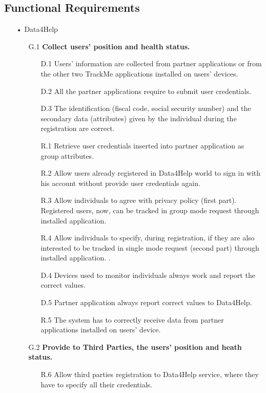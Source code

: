 \subsection{Functional Requirements}
\begin{enumerate}
\item[•]{\Large Data4Help}
	\begin{enumerate}
	\item [G.1] \textbf{Collect users' position and health status.}
		\begin{enumerate}
		\item [D.1] Users' information are collected from partner applications or from the other two TrackMe applications installed on users' devices.
		\item [D.2] All the partner applications require to submit user credentials.
		\item [D.3] The identification (fiscal code, social security number) and the secondary data (attributes) given by the individual during the registration are correct.
		\item [R.1] Retrieve user credentials inserted into partner application as group attributes.
		\item [R.2] Allow users already registered in Data4Help world to sign in with his account without provide user credentials again.
		\item [R.3] Allow individuals to agree with privacy policy (first part). Registered users, now, can be tracked in group mode request through installed application.  
		\item [R.4] Allow individuals to specify, during registration, if they are also interested to be tracked in single mode request (second part) through installed application.  .
		\item [D.4] Devices used to monitor individuals always work and report 			the correct values.	
    	\item [D.5] Partner application always report correct values to Data4Help.
    	\item [R.5] The system has to correctly receive data from partner applications installed on users' device.
    	\end{enumerate}	
    	
    \item [G.2] \textbf{Provide to Third Parties, the users' position and heath status.}
    	\begin{enumerate} 
    	\item [R.6] Allow third parties registration to Data4Help service, where they have to specify all their credentials.
    	\end{enumerate}	
		

\end{enumerate}
\end{enumerate}
